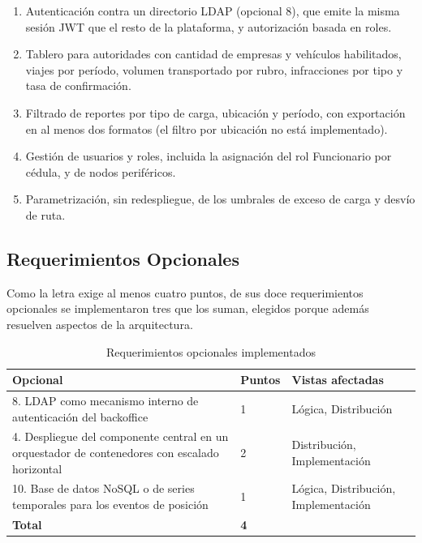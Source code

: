 \begin{enumerate}
    \item Autenticación contra un directorio LDAP (opcional 8), que emite la misma sesión JWT que el resto de la plataforma, y autorización basada en roles.
    \item Tablero para autoridades con cantidad de empresas y vehículos habilitados, viajes por período, volumen transportado por rubro, infracciones por tipo y tasa de confirmación.
    \item Filtrado de reportes por tipo de carga, ubicación y período, con exportación en al menos dos formatos (el filtro por ubicación no está implementado).
    \item Gestión de usuarios y roles, incluida la asignación del rol Funcionario por cédula, y de nodos periféricos.
    \item Parametrización, sin redespliegue, de los umbrales de exceso de carga y desvío de ruta.
\end{enumerate}

\subsection{Requerimientos Opcionales}

Como la letra exige al menos cuatro puntos, de sus doce requerimientos opcionales se implementaron tres que los suman, elegidos porque además resuelven aspectos de la arquitectura.

\begin{table}[H]
    \small
    \centering
    \caption{Requerimientos opcionales implementados}
    \label{tab:opcionales}
    \begin{tabular}{|p{9.6cm}|p{1.4cm}|p{4.2cm}|}
        \hline
        \textbf{Opcional} & \textbf{Puntos} & \textbf{Vistas afectadas} \\
        \hline
        8. LDAP como mecanismo interno de autenticación del backoffice & 1 & Lógica, Distribución \\
        \hline
        4. Despliegue del componente central en un orquestador de contenedores con escalado horizontal & 2 & Distribución, Implementación \\
        \hline
        10. Base de datos NoSQL o de series temporales para los eventos de posición & 1 & Lógica, Distribución, Implementación \\
        \hline
        \textbf{Total} & \textbf{4} & \\
        \hline
    \end{tabular}
\end{table}

